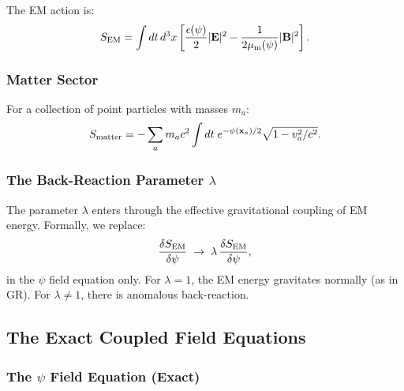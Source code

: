 \documentclass[aps,prd,twocolumn,superscriptaddress,floatfix,nofootinbib]{revtex4-2}
\begin{document}
The EM action is:
\begin{equation}
S_{\rm EM} = \int dt\,d^3x\left[
  \frac{\epsilon(\psi)}{2}|\mathbf{E}|^2
  - \frac{1}{2\mu_{\rm m}(\psi)}|\mathbf{B}|^2
\right].
\label{eq:S-EM}
\end{equation}

\subsubsection{Matter Sector}

For a collection of point particles with masses $m_a$:
\begin{equation}
S_{\rm matter} = -\sum_a m_a c^2 \int dt\;
e^{-\psi(\mathbf{x}_a)/2}\sqrt{1 - v_a^2/c^2}.
\label{eq:S-matter}
\end{equation}

\subsubsection{The Back-Reaction Parameter $\lambda$}

The parameter $\lambda$ enters through the effective gravitational
coupling of EM energy. Formally, we replace:
\begin{equation}
\frac{\delta S_{\rm EM}}{\delta\psi} \;\to\;
\lambda\,\frac{\delta S_{\rm EM}}{\delta\psi},
\label{eq:lambda-def}
\end{equation}
in the $\psi$ field equation only. For $\lambda = 1$, the EM energy
gravitates normally (as in GR). For $\lambda \neq 1$, there is
anomalous back-reaction.

\subsection{The Exact Coupled Field Equations}\label{sec:exact-eqs}

\subsubsection{The $\psi$ Field Equation (Exact)}
\end{document}
